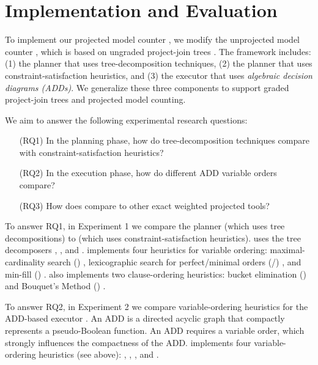 \section{Implementation and Evaluation}
\label{sec:procount:experiments}

To implement our projected model counter \procount, we modify the unprojected model counter \dpmc{}, which is based on ungraded project-join trees \cite{dudek2020dpmc}.
The \dpmc{} framework includes: 
(1) the \Lg{} planner that uses tree-decomposition techniques, 
(2) the \htb{} planner that uses constraint-satisfaction heuristics, and
(3) the \dmc{} executor that uses \emph{algebraic decision diagrams (ADDs)}.
We generalize these three components to support graded project-join trees and projected model counting.

We aim to answer the following experimental research questions:
\begin{enumerate}
    \item[(RQ1)] In the planning phase, how do tree-decomposition techniques compare with constraint-satisfaction heuristics?
    \item[(RQ2)] In the execution phase, how do different ADD variable orders compare?
    \item[(RQ3)] How does \procount{} compare to other exact weighted projected tools?
\end{enumerate}

To answer RQ1, in Experiment 1 we compare the planner \Lg{} (which uses tree decompositions) to \htb{} (which uses constraint-satisfaction heuristics).
\Lg{} uses the tree decomposers \flowcutter{} \cite{strasser2017computing}, \htd{} \cite{AMW17}, and \tamaki{} \cite{Tamaki17}.
\htb{} implements four heuristics for variable ordering: maximal-cardinality search (\mcs{}) \cite{tarjan1984simple}, lexicographic search for perfect/minimal orders (\lexp/\lexm{}) \cite{koster2001treewidth}, and min-fill (\minfill{}) \cite{dechter03}.
\htb{} also implements two clause-ordering heuristics: bucket elimination (\be) \cite{dechter99} and Bouquet's Method (\bm) \cite{bouquet1999gestion}%
.

To answer RQ2, in Experiment 2 we compare variable-ordering heuristics for the ADD-based executor \dmc.
An ADD \cite{bahar1997algebraic} is a directed acyclic graph that compactly represents a pseudo-Boolean function.
An ADD requires a variable order, which strongly influences the compactness of the ADD.
\dmc{} implements four variable-ordering heuristics (see above): \mcs, \lexp, \lexm, and \minfill{}.

